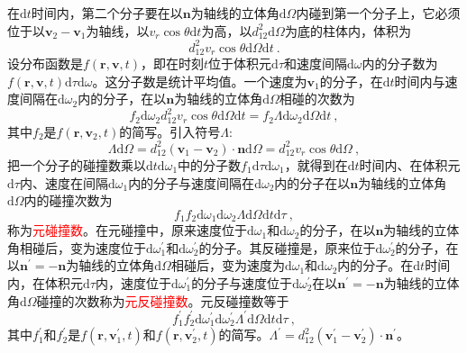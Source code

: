 \documentclass[12pt,a4paper]{article}
\renewcommand{\vec}[1]{\boldsymbol{#1}}
\newcommand{\dif}{\mathrm{d}}
\begin{document}
在$\dif t$时间内，第二个分子要在以$\vec{n}$为轴线的立体角$\dif \Omega$内碰到第一个分子上，它必须位于以$\vec{v}_2-\vec{v}_1$为轴线，以$v_r \cos \theta \dif t$为高，以$d^2_{12} \dif \Omega$为底的柱体内，体积为
\begin{equation}
d^2_{12} v_r \cos \theta \dif \Omega \dif t ~.
\end{equation}
设分布函数是$f(\vec{r}, \vec{v}, t)$，即在时刻$t$位于体积元$\dif \tau$和速度间隔$\dif \omega$内的分子数为$f(\vec{r}, \vec{v}, t) \dif \tau \dif \omega$。这分子数是统计平均值。一个速度为$\vec{v}_1$的分子，在$\dif t$时间内与速度间隔在$\dif \omega_2$内的分子，在以$\vec{n}$为轴线的立体角$\dif \Omega$相碰的次数为
\begin{equation}
f_2 \dif \omega_2 d^2_{12} v_r \cos \theta \dif \Omega \dif t  = f_2 \Lambda \dif \omega_2 \dif \Omega \dif t~,
\end{equation}
其中$f_2$是$f(\vec{r}, \vec{v}_2, t)$的简写。引入符号$\Lambda$:
\begin{equation}
\Lambda  \dif \Omega = d_{12}^2 (\vec{v}_1-\vec{v}_2) \cdot \vec{n} \dif \Omega = d_{12}^2 v_r \cos \theta \dif \Omega ~,
\end{equation}
把一个分子的碰撞数乘以$\dif t\dif \omega_1$中的分子数$f_1 \dif \tau \dif \omega_1$，就得到在$\dif t$时间内、在体积元$\dif \tau$内、速度在间隔$\dif \omega_1$内的分子与速度间隔在$\dif \omega_2$内的分子在以$\vec{n}$为轴线的立体角$\dif \Omega$内的碰撞次数为
\begin{equation}
f_1 f_2 \dif \omega_1 \dif \omega_2 \Lambda \dif \Omega \dif t \dif \tau ~,
\end{equation}
称为\textcolor{red}{元碰撞数}。在元碰撞中，原来速度位于$\dif \omega_1$和$\dif \omega_2$的分子，在以$\vec{n}$为轴线的立体角相碰后，变为速度位于$\dif \omega^\prime_1$和$\dif \omega^\prime_2$的分子。其反碰撞是，原来位于$\dif \omega^\prime_2$的分子，在以$\vec{n}^\prime = -\vec{n}$为轴线的立体角$\dif \Omega$相碰后，变为速度为$\dif \omega_1$和$\dif \omega_2$内的分子。在$\dif t$时间内，在体积元$\dif \tau$内，速度位于$\dif \omega^\prime_1$的分子与速度位于$\dif \omega^\prime_2$在以$\vec{n}^\prime = -\vec{n}$为轴线的立体角$\dif \Omega$碰撞的次数称为\textcolor{red}{元反碰撞数}。元反碰撞数等于
\begin{equation}
f^\prime_1 f^\prime_2 \dif \omega^\prime_1 \dif \omega^\prime_2 \Lambda^\prime \dif \Omega \dif t \dif \tau ~,
\end{equation}
其中$f^\prime_1$和$f^\prime_2$是$f(\vec{r}, \vec{v}^\prime_1, t)$和$f(\vec{r}, \vec{v}^\prime_2, t)$的简写。$\Lambda^\prime = d_{12}^2 (\vec{v}^\prime_1-\vec{v}^\prime_2) \cdot \vec{n}^\prime$。
\end{document}
